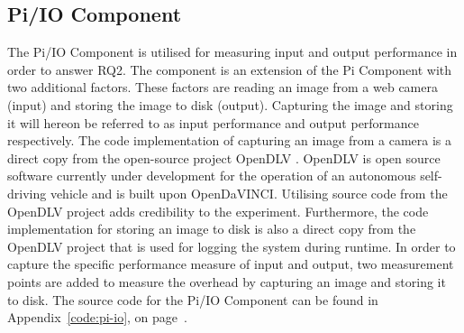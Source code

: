 


\subsection{Pi/IO Component}
The Pi/IO Component is utilised for measuring input and output performance in order to answer RQ2. The component is an extension of the Pi Component with two additional factors. These factors are reading an image from a web camera (input) and storing the image to disk (output). Capturing the image and storing it will hereon be referred to as input performance  and output performance  respectively. The code implementation of capturing an image from a camera is a direct copy from the open-source project OpenDLV \cite{opendlv}. OpenDLV is open source software currently under development for the operation of an autonomous self-driving vehicle and is built upon OpenDaVINCI. Utilising source code from the OpenDLV project adds credibility to the experiment. Furthermore, the code implementation for storing an image to disk is also a direct copy from the OpenDLV project that is used for logging the system during runtime. In order to capture the specific performance measure of input and output, two measurement points are added to measure the overhead by capturing an image and storing it to disk. The source code for the Pi/IO Component can be found in Appendix~\ref{code:pi-io}, on page~\pageref{code:pi-io}.

